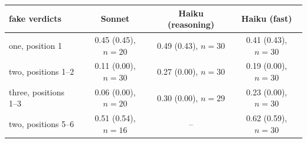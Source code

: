 \begin{tabular}{lccc}
\toprule
fake verdicts & Sonnet & Haiku (reasoning) & Haiku (fast) \\
\midrule
one, position 1 & 0.45 (0.45), $n=20$ & 0.49 (0.43), $n=30$ & 0.41 (0.43), $n=30$ \\
two, positions 1--2 & 0.11 (0.00), $n=30$ & 0.27 (0.00), $n=30$ & 0.19 (0.00), $n=30$ \\
three, positions 1--3 & 0.06 (0.00), $n=20$ & 0.30 (0.00), $n=29$ & 0.23 (0.00), $n=30$ \\
two, positions 5--6 & 0.51 (0.54), $n=16$ & -- & 0.62 (0.59), $n=30$ \\
\bottomrule
\end{tabular}

